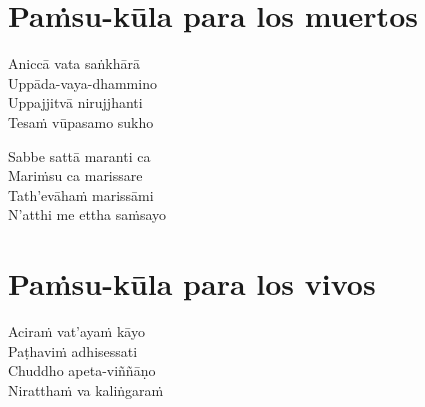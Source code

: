 \clearpage

\chapter{Paṁsu-kūla para los muertos}


\begin{paritta}
Aniccā vata saṅkhārā\\
Uppāda-vaya-dhammino\\
Uppajjitvā nirujjhanti\\
Tesaṁ vūpasamo sukho

Sabbe sattā maranti ca\\
Mariṁsu ca marissare\\
Tath'evāhaṁ marissāmi\\
N'atthi me ettha saṁsayo


\end{paritta}

\chapter{Paṁsu-kūla para los vivos}


\begin{paritta}
Aciraṁ vat'ayaṁ kāyo\\
Paṭhaviṁ adhisessati\\
Chuddho apeta-viññāṇo\\
Niratthaṁ va kaliṅgaraṁ


\end{paritta}


